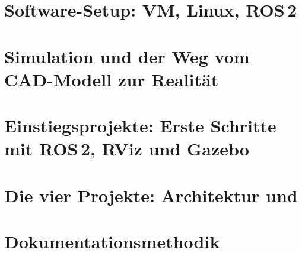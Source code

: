 \documentclass[11pt,a4paper]{report}
\begin{document}
\part{Software-Setup: VM, Linux, ROS\,2}




\part{Simulation und der Weg vom CAD-Modell zur Realität}





\part{Einstiegsprojekte: Erste Schritte mit ROS\,2, RViz und Gazebo}




\part{Die vier Projekte: Architektur und }






\part{Dokumentationsmethodik}



\clearpage
\printbibliography[heading=bibintoc,title={Literaturverzeichnis}]
\end{document}
